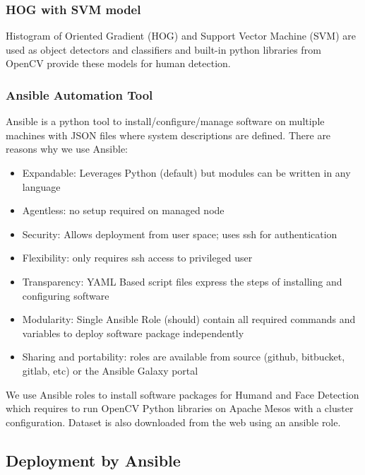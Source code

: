 \subsubsection{HOG with SVM model}\label{hog-with-svm-model}

Histogram of Oriented Gradient (HOG) and Support Vector Machine (SVM)
are used as object detectors and classifiers and built-in python
libraries from OpenCV provide these models for human detection.

\subsubsection{Ansible Automation Tool}\label{ansible-automation-tool}

Ansible is a python tool to install/configure/manage software on
multiple machines with JSON files where system descriptions are defined.
There are reasons why we use Ansible:

\begin{itemize}
\tightlist
\item
  Expandable: Leverages Python (default) but modules can be written in
  any language
\item
  Agentless: no setup required on managed node
\item
  Security: Allows deployment from user space; uses ssh for
  authentication
\item
  Flexibility: only requires ssh access to privileged user
\item
  Transparency: YAML Based script files express the steps of installing
  and configuring software
\item
  Modularity: Single Ansible Role (should) contain all required commands
  and variables to deploy software package independently
\item
  Sharing and portability: roles are available from source (github,
  bitbucket, gitlab, etc) or the Ansible Galaxy portal
\end{itemize}

We use Ansible roles to install software packages for Humand and Face
Detection which requires to run OpenCV Python libraries on Apache Mesos
with a cluster configuration. Dataset is also downloaded from the web
using an ansible role.

\subsection{Deployment by Ansible}\label{deployment-by-ansible}

